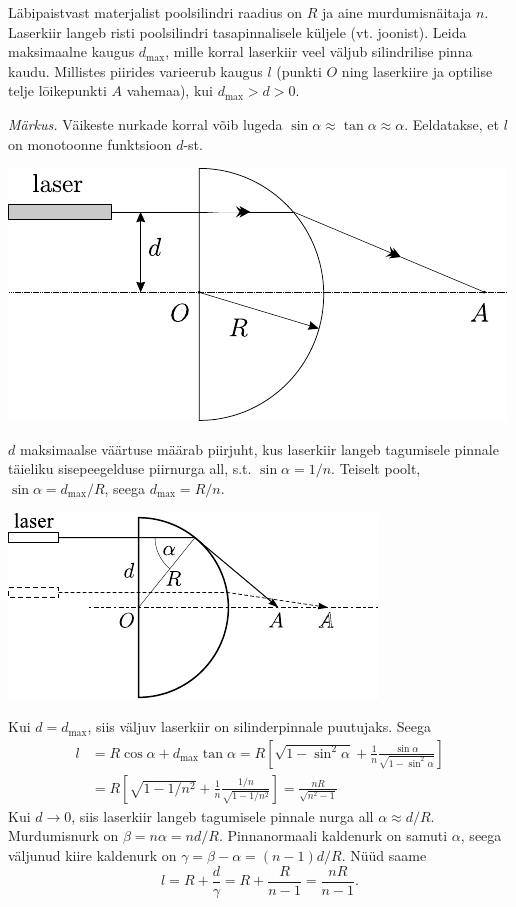
Läbipaistvast materjalist poolsilindri raadius on $R$ ja aine murdumisnäitaja $n$. Laserkiir langeb risti poolsilindri tasapinnalisele küljele (vt. joonist). Leida maksimaalne kaugus $d_{\max}$, mille korral laserkiir veel väljub silindrilise pinna kaudu. Millistes piirides varieerub kaugus $l$ (punkti $O$ ning laserkiire ja optilise telje lōikepunkti $A$ vahemaa), kui $d_{\max }>d>0$.

\emph{Märkus.} Väikeste nurkade korral võib lugeda $\sin \alpha \approx \tan \alpha \approx \alpha$. Eeldatakse, et $l$ on monotoonne funktsioon $d$-st.
\begin{center}
	\includegraphics[width=0.8\linewidth]{2004-v3g-07-yl.pdf}
\end{center}

\hint

\solu
$d$ maksimaalse väärtuse määrab piirjuht, kus laserkiir langeb tagumisele pinnale täieliku sisepeegelduse piirnurga all, s.t. $\sin \alpha=1 / n$. Teiselt poolt, $\sin \alpha=d_{\max } / R$, seega $d_{\max }=R / n$.
\begin{center}
	\includegraphics[width=0.8\linewidth]{2004-v3g-07-lah.pdf}
\end{center}
Kui $d=d_{\max}$, siis väljuv laserkiir on silinderpinnale puutujaks. Seega
$$
\begin{aligned}
	l &=R \cos \alpha+d_{\max } \tan \alpha=R\left[\sqrt{1-\sin ^{2} \alpha}+\frac{1}{n} \frac{\sin \alpha}{\sqrt{1-\sin ^{2} \alpha}}\right] \\
	&=R\left[\sqrt{1-1 / n^{2}}+\frac{1}{n} \frac{1 / n}{\sqrt{1-1 / n^{2}}}\right]=\frac{n R}{\sqrt{n^{2}-1}}
\end{aligned}
$$
Kui $d \rightarrow 0$, siis laserkiir langeb tagumisele pinnale nurga all $\alpha \approx d / R$. Murdumisnurk on $\beta=n \alpha=n d / R.$ Pinnanormaali kaldenurk on samuti $\alpha$, seega väljunud kiire kaldenurk on $\gamma=\beta-\alpha=(n-1) d / R$. Nüüd saame
$$
l=R+\frac{d}{\gamma}=R+\frac{R}{n-1}=\frac{n R}{n-1} .
$$

\probend